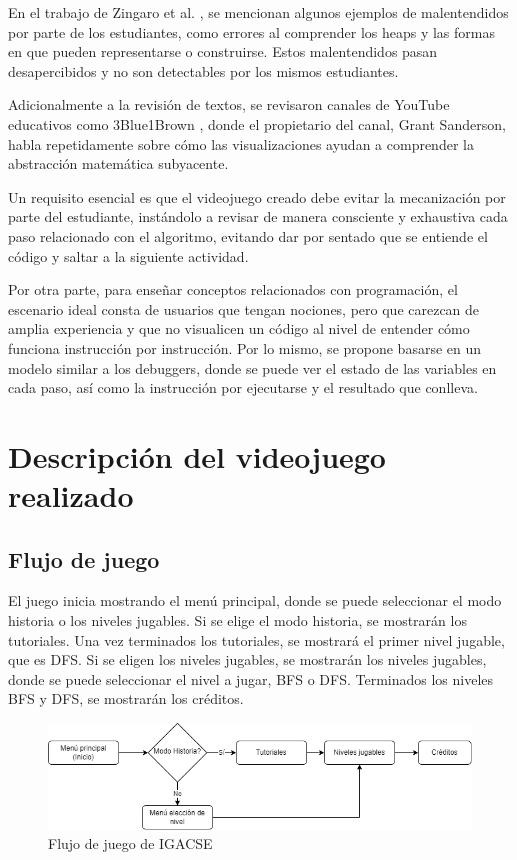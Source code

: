 En el trabajo de Zingaro et al. \cite{IdentifyingStudentDifficultiesDataStructures}, se mencionan algunos ejemplos de malentendidos por parte de los estudiantes, como errores al comprender los heaps y las formas en que pueden representarse o construirse. Estos malentendidos pasan desapercibidos y no son detectables por los mismos estudiantes.

Adicionalmente a la revisión de textos, se revisaron canales de YouTube educativos como 3Blue1Brown \cite{3Blue1BrownYT}, donde el propietario del canal, Grant Sanderson, habla repetidamente sobre cómo las visualizaciones ayudan a comprender la abstracción matemática subyacente.

Un requisito esencial es que el videojuego creado debe evitar la mecanización por parte del estudiante, instándolo a revisar de manera consciente y exhaustiva cada paso relacionado con el algoritmo, evitando dar por sentado que se entiende el código y saltar a la siguiente actividad.

Por otra parte, para enseñar conceptos relacionados con programación, el escenario ideal consta de usuarios que tengan nociones, pero que carezcan de amplia experiencia y que no visualicen un código al nivel de entender cómo funciona instrucción por instrucción. Por lo mismo, se propone basarse en un modelo similar a los debuggers, donde se puede ver el estado de las variables en cada paso, así como la instrucción por ejecutarse y el resultado que conlleva.


\section{Descripción del videojuego realizado}

\subsection{Flujo de juego}

El juego inicia mostrando el menú principal, donde se puede seleccionar el modo historia o los niveles jugables. Si se elige el modo historia, se mostrarán los tutoriales. Una vez terminados los tutoriales, se mostrará el primer nivel jugable, que es DFS. Si se eligen los niveles jugables, se mostrarán los niveles jugables, donde se puede seleccionar el nivel a jugar, BFS o DFS.
Terminados los niveles BFS y DFS, se mostrarán los créditos.

\begin{figure}[h]
	\centering
	\includegraphics[scale=.5]{imagenes/FlujoDeJuego.png}
	\caption{ Flujo de juego de IGACSE}
	\label{FlujoDeJuego}
\end{figure}


